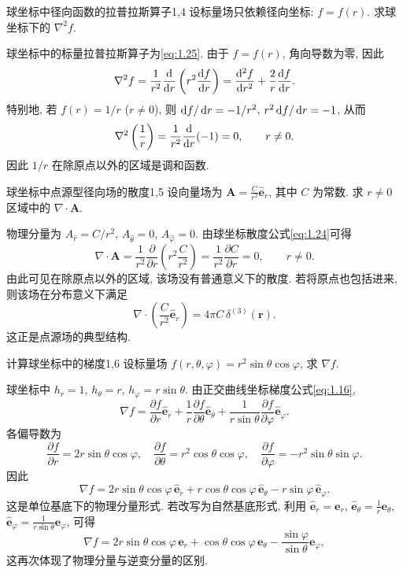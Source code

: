 \begin{example}{球坐标中径向函数的拉普拉斯算子}{1,4}
设标量场只依赖径向坐标: $f=f(r)$. 求球坐标下的 $\nabla^{2} f$.
 \begin{solution}
 	球坐标中的标量拉普拉斯算子为\eqref{eq:1.25}. 由于 $f=f(r)$, 角向导数为零, 因此
 	\[
 	\nabla^{2} f
 	=
 	\frac{1}{r^{2}}
 	\frac{\dif}{\dif r}
 	\left(
 	r^{2}\frac{\dif f}{\dif r}
 	\right)
 	=
 	\frac{\dif^{2} f}{\dif r^{2}}
 	+
 	\frac{2}{r}\frac{\dif f}{\dif r}.
 	\]
 	特别地, 若 $f(r)=1/r$ ($r\neq 0$), 则 $\mathop{}\!\mathrm{d} f/\mathop{}\!\mathrm{d} r = -1/r^{2}$, $r^{2}\mathop{}\!\mathrm{d} f/\mathop{}\!\mathrm{d} r = -1$, 从而
 	\[
 	\nabla^{2}\left(\frac{1}{r}\right)
 	=
 	\frac{1}{r^{2}}\frac{\mathop{}\!\mathrm{d}}{\mathop{}\!\mathrm{d} r}(-1)=0,
 	\qquad r\neq 0.
 	\]
 	因此 $1/r$ 在除原点以外的区域是调和函数. 
 \end{solution}
\end{example}

\begin{example}{球坐标中点源型径向场的散度}{1,5}
设向量场为 $\bm{A} = \frac{C}{r^{2}}\hat{\bm{e}}_{r}$, 其中 $C$ 为常数. 求 $r\neq 0$ 区域中的 $\nabla\cdot\bm{A}$.
 \begin{solution}
 	物理分量为 $A_{\hat{r}}=C/r^{2}$, $A_{\hat{\theta}}=0$, $A_{\hat{\varphi}}=0$. 由球坐标散度公式\eqref{eq:1.24}可得
 	\[
 	\nabla\cdot\bm{A}
 	=
 	\frac{1}{r^{2}}
 	\frac{\partial}{\partial r}
 	\left(
 	r^{2}\frac{C}{r^{2}}
 	\right)
 	=
 	\frac{1}{r^{2}}\frac{\partial C}{\partial r}
 	=
 	0,
 	\qquad r\neq 0.
 	\]
 	由此可见在除原点以外的区域, 该场没有普通意义下的散度. 若将原点也包括进来, 则该场在分布意义下满足
 	\[
 	\nabla\cdot\left(\frac{C}{r^{2}}\hat{\bm{e}}_{r}\right)
 	=
 	4\pi C\,\delta^{(3)}(\bm{r}).
 	\]
 	这正是点源场的典型结构. 
 \end{solution}
\end{example}

\begin{example}{计算球坐标中的梯度}{1,6}
设标量场 $f(r,\theta,\varphi)=r^{2}\sin{\theta}\cos{\varphi}$, 求 $\nabla f$. 
\begin{solution}
	球坐标中 $h_{r}=1$, $h_{\theta}=r$, $h_{\varphi}=r\sin{\theta}$. 由正交曲线坐标梯度公式\eqref{eq:1.16}, 
	\[
	\nabla f
	=
	\frac{\partial f}{\partial r}\hat{\bm{e}}_{r}
	+
	\frac{1}{r}\frac{\partial f}{\partial\theta}\hat{\bm{e}}_{\theta}
	+
	\frac{1}{r\sin{\theta}}\frac{\partial f}{\partial\varphi}\hat{\bm{e}}_{\varphi}.
	\]
	各偏导数为
	\[
	\frac{\partial f}{\partial r} = 2r\sin{\theta}\cos{\varphi},\quad
	\frac{\partial f}{\partial\theta} = r^{2}\cos{\theta}\cos{\varphi},\quad
	\frac{\partial f}{\partial\varphi} = -r^{2}\sin{\theta}\sin{\varphi}.
	\]
	因此
	\[
	\nabla f
	=
	2r\sin{\theta}\cos{\varphi}\,\hat{\bm{e}}_{r}
	+
	r\cos{\theta}\cos{\varphi}\,\hat{\bm{e}}_{\theta}
	-
	r\sin{\varphi}\,\hat{\bm{e}}_{\varphi}.
	\]
	这是单位基底下的物理分量形式. 若改写为自然基底形式, 利用 $\hat{\bm{e}}_{r}=\bm{e}_{r}$, $\hat{\bm{e}}_{\theta}=\frac{1}{r}\bm{e}_{\theta}$, $\hat{\bm{e}}_{\varphi}=\frac{1}{r\sin{\theta}}\bm{e}_{\varphi}$, 可得
	\[
	\nabla f
	=
	2r\sin{\theta}\cos{\varphi}\,\bm{e}_{r}
	+
	\cos{\theta}\cos{\varphi}\,\bm{e}_{\theta}
	-
	\frac{\sin{\varphi}}{\sin{\theta}}\bm{e}_{\varphi},
	\]
	这再次体现了物理分量与逆变分量的区别. 
\end{solution}
\end{example}

